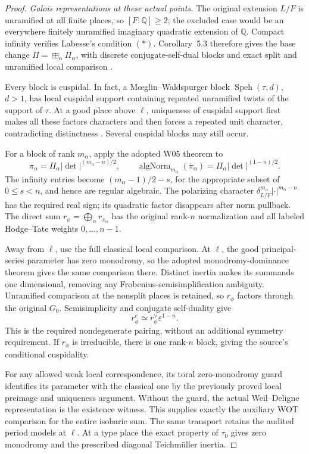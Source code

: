 \begin{proof}
\emph{Galois representations at these actual points.}
The original extension \(L/F\) is unramified at all finite places,
so \([F:\mathbb Q]\ge2\); the excluded case would be an everywhere
finitely unramified imaginary quadratic extension of \(\mathbb Q\).
Compact infinity verifies Labesse's condition \((*)\).
Corollary~5.3 therefore gives the base change
\(\Pi=\boxplus_\alpha\Pi_\alpha\), with discrete conjugate-self-dual
blocks and exact split and unramified local comparison
\cite{SelmerHeckeDetLabesse}.

Every block is cuspidal.  In fact, a M\oe glin--Waldspurger block
\(\operatorname{Speh}(\tau,d)\), \(d>1\), has local cuspidal
support containing repeated unramified twists of the support of
\(\tau\).  At a good place above \(\ell\), uniqueness of cuspidal
support first makes all these factors characters and then forces
a repeated unit character, contradicting distinctness
\cite{SelmerHeckeDetMW}.  Several cuspidal blocks may still occur.

For a block of rank \(m_\alpha\), apply the adopted W05 theorem to
\[
 \pi_\alpha=\Pi_\alpha|\det|^{(m_\alpha-n)/2},\qquad
 \operatorname{algNorm}_{m_\alpha}(\pi_\alpha)
              =\Pi_\alpha|\det|^{(1-n)/2}.
\]
The infinity entries become \((m_\alpha-1)/2-s\), for the
appropriate subset of \(0\le s<n\), and hence are regular
algebraic.  The polarizing character
\(\delta_{L/F}^{m_\alpha}|\cdot|^{m_\alpha-n}\) has the required
real sign; its quadratic factor disappears after norm pullback.
The direct sum \(r_\phi=\bigoplus_\alpha r_{\pi_\alpha}\) has
the original rank-\(n\) normalization and all labeled
Hodge--Tate weights \(0,\ldots,n-1\).

Away from \(\ell\), use the full classical local comparison.
At \(\ell\), the good principal-series parameter has zero
monodromy, so the adopted monodromy-dominance theorem gives the
same comparison there.  Distinct inertia makes its summands
one dimensional, removing any Frobenius-semisimplification
ambiguity.  Unramified comparison at the nonsplit places is
retained, so \(r_\phi\) factors through the original \(G_0\).
Semisimplicity and conjugate self-duality give
\[
                  r_\phi^c\simeq r_\phi^\vee\varepsilon^{1-n}.
\]
This is the required nondegenerate pairing, without an additional
symmetry requirement.  If \(r_\phi\) is irreducible, there is one
rank-\(n\) block, giving the source's conditional cuspidality.

For any allowed weak local correspondence, its toral
zero-monodromy guard identifies its parameter with the classical
one by the previously proved local preimage and uniqueness
argument.  Without the guard, the actual Weil--Deligne
representation is the existence witness.  This supplies exactly
the auxiliary WOT comparison for the entire isobaric sum.
The same transport retains the audited period models at \(\ell\).
At a type place the exact property of \(\tau_0\) gives zero
monodromy and the prescribed diagonal Teichm\"uller inertia.


\end{proof}
